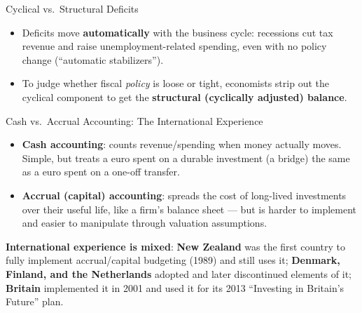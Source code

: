 \documentclass[11pt,aspectratio=169]{beamer}
\begin{document}
\begin{frame}{Cyclical vs.\ Structural Deficits}
  \small
  \begin{itemize}
    \item Deficits move \textbf{automatically} with the business cycle: recessions cut tax revenue and raise unemployment-related spending, even with no policy change (``automatic stabilizers'').
    \item To judge whether fiscal \emph{policy} is loose or tight, economists strip out the cyclical component to get the \textbf{structural (cyclically adjusted) balance}.
\end{itemize}
\end{frame}

\begin{frame}{Cash vs.\ Accrual Accounting: The International Experience}
 
  \begin{itemize}
    \item \textbf{Cash accounting}: counts revenue/spending when money actually moves. Simple, but treats a euro spent on a durable investment (a bridge) the same as a euro spent on a one-off transfer.
    \item \textbf{Accrual (capital) accounting}: spreads the cost of long-lived investments over their useful life, like a firm's balance sheet --- but is harder to implement and easier to manipulate through valuation assumptions.
  \end{itemize}
  \vspace{0.3em}
  \textbf{International experience is mixed}: \textbf{New Zealand} was the first country to fully implement accrual/capital budgeting (1989) and still uses it; \textbf{Denmark, Finland, and the Netherlands} adopted and later discontinued elements of it; \textbf{Britain} implemented it in 2001 and used it for its 2013 ``Investing in Britain's Future'' plan.
 
\end{frame}
\end{document}
